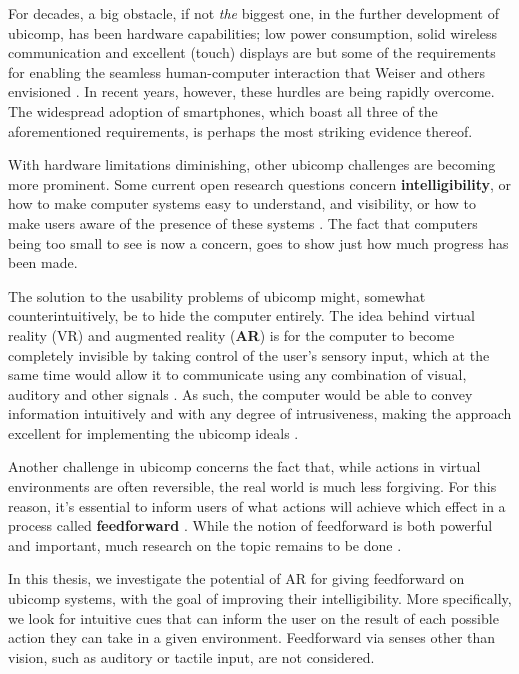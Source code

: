 
For decades, a big obstacle, if not \textit{the} biggest one, in the further development of ubicomp, has been hardware capabilities; low power consumption, solid wireless communication and excellent (touch) displays are but some of the requirements for enabling the seamless human-computer interaction that Weiser and others envisioned \cite{weiser1993some}. In recent years, however, these hurdles are being rapidly overcome. The widespread adoption of smartphones, which boast all three of the aforementioned requirements, is perhaps the most striking evidence thereof.

With hardware limitations diminishing, other ubicomp challenges are becoming more prominent. Some current open research questions concern \textbf{intelligibility}, or how to make computer systems easy to understand, and visibility, or how to make users aware of the presence of these systems \cite{vermeulen2009bet,vermeulen2013intelligibility}. The fact that computers being too small to see is now a concern, goes to show just how much progress has been made.

The solution to the usability problems of ubicomp might, somewhat counterintuitively, be to hide the computer entirely. The idea behind virtual reality (VR) and augmented reality (\textbf{AR}) is for the computer to become completely invisible by taking control of the user's sensory input, which at the same time would allow it to communicate using any combination of visual, auditory and other signals \cite{rheingold1991virtual}. As such, the computer would be able to convey information intuitively and with any degree of intrusiveness, making the approach excellent for implementing the ubicomp ideals \cite{weiser1993some}.

Another challenge in ubicomp concerns the fact that, while actions in virtual environments are often reversible, the real world is much less forgiving. For this reason, it's essential to inform users of what actions will achieve which effect in a process called \textbf{feedforward} \cite{djajadiningrat2002but}. While the notion of feedforward is both powerful and important, much research on the topic remains to be done \cite{vermeulen2013crossing}.

In this thesis, we investigate the potential of AR for giving feedforward on ubicomp systems, with the goal of improving their intelligibility. More specifically, we look for intuitive cues that can inform the user on the result of each possible action they can take in a given environment. Feedforward via senses other than vision, such as auditory or tactile input, are not considered.

